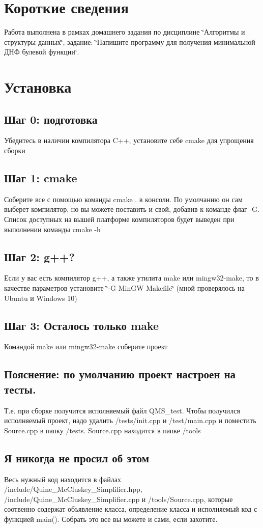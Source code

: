 \hypertarget{index_intro_sec}{}\section{Короткие сведения}\label{index_intro_sec}
Работа выполнена в рамках домашнего задания по дисциплине \char`\"{}Алгоритмы и структуры данных\char`\"{}, задание\+: \char`\"{}Напишите программу для получения минимальной ДНФ булевой
  функции\char`\"{}.\hypertarget{index_install_sec}{}\section{Установка}\label{index_install_sec}
\hypertarget{index_step0}{}\subsection{Шаг 0\+: подготовка}\label{index_step0}
Убедитесь в наличии компилятора C++, установите себе cmake для упрощения сборки \hypertarget{index_step1}{}\subsection{Шаг 1\+: cmake}\label{index_step1}
Соберите все с помощью команды cmake . в консоли. По умолчанию он сам выберет компилятор, но вы можете поставить и свой, добавив к команде флаг -\/G. Список доступных на вышей платформе компиляторов будет выведен при выполнении команды cmake -\/h \hypertarget{index_step2}{}\subsection{Шаг 2\+: g++?}\label{index_step2}
Если у вас есть компилятор g++, а также утилита make или mingw32-\/make, то в качестве параметров установите \char`\"{}-\/\+G Min\+G\+W Makefile\char`\"{} (мной проверялось на Ubuntu и Windows 10) \hypertarget{index_step3}{}\subsection{Шаг 3\+: Осталось только make}\label{index_step3}
Командой make или mingw32-\/make соберите проект \hypertarget{index_step4}{}\subsection{Пояснение\+: по умолчанию проект настроен на тесты.}\label{index_step4}
Т.\+е. при сборке получится исполняемый файл Q\+M\+S\+\_\+test. Чтобы получился исполняемый проект, надо удалить /tests/init.cpp и /test/main.cpp и поместить Source.\+cpp в папку /tests. Source.\+cpp находится в папке /tools\hypertarget{index_else}{}\subsection{Я никогда не просил об этом}\label{index_else}
Весь нужный код находится в файлах /include/\+Quine\+\_\+\+Mc\+Cluskey\+\_\+\+Simplifier.hpp, /include/\+Quine\+\_\+\+Mc\+Cluskey\+\_\+\+Simplifier.cpp и /tools/\+Source.cpp, которые соотвенно содержат объявление класса, определение класса и исполняемый код с функцией main(). Собрать это все вы можете и сами, если захотите. 